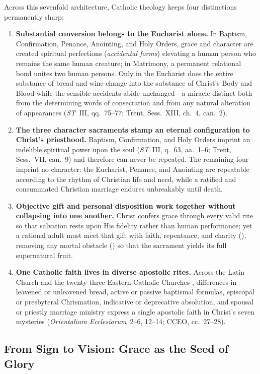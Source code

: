 Across this sevenfold architecture, Catholic theology keeps four distinctions permanently sharp:
\begin{enumerate}
  \item \textbf{Substantial conversion belongs to the Eucharist alone.} In Baptism, Confirmation, Penance, Anointing, and Holy Orders, grace and character are created spiritual perfections (\emph{accidental forms}) elevating a human person who remains the same human creature; in Matrimony, a permanent relational bond unites two human persons. Only in the Eucharist does the entire substance of bread and wine change into the substance of Christ's Body and Blood while the sensible accidents abide unchanged---a miracle distinct both from the determining words of consecration and from any natural alteration of appearances (\emph{ST}~III, qq.~75--77; Trent, Sess.~XIII, ch.~4, can.~2).
  \item \textbf{The three character sacraments stamp an eternal configuration to Christ's priesthood.} Baptism, Confirmation, and Holy Orders imprint an indelible spiritual power upon the soul (\emph{ST}~III, q.~63, aa.~1--6; Trent, Sess.~VII, can.~9) and therefore can never be repeated. The remaining four imprint no character: the Eucharist, Penance, and Anointing are repeatable according to the rhythm of Christian life and need, while a ratified and consummated Christian marriage endures unbreakably until death.
  \item \textbf{Objective gift and personal disposition work together without collapsing into one another.} Christ confers grace  through every valid rite so that salvation rests upon His fidelity rather than human performance; yet a rational adult must meet that gift with faith, repentance, and charity (), removing any mortal obstacle () so that the sacrament yields its full supernatural fruit.
  \item \textbf{One Catholic faith lives in diverse apostolic rites.} Across the Latin Church and the twenty-three Eastern Catholic Churches , differences in leavened or unleavened bread, active or passive baptismal formulas, episcopal or presbyteral Chrismation, indicative or deprecative absolution, and spousal or priestly marriage ministry express a single apostolic faith in Christ's seven mysteries (\emph{Orientalium Ecclesiarum}~2--6, 12--14; CCEO, cc.~27--28).
\end{enumerate}

\subsection{From Sign to Vision: Grace as the Seed of Glory}
\label{subsec:sign-to-vision}

